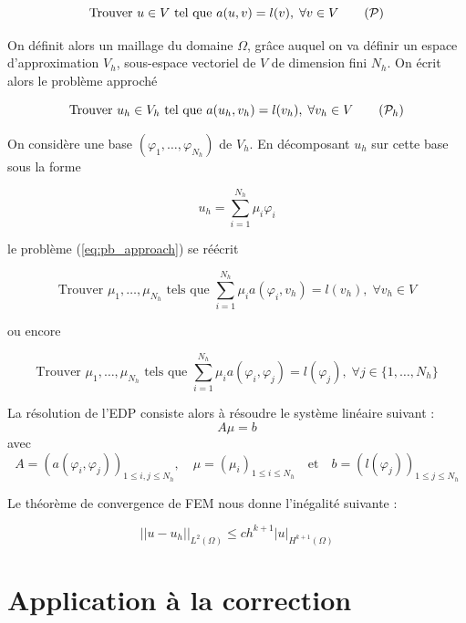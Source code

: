 \documentclass[french]{article}
\begin{document}
	\begin{equation}
		\text{Trouver } u\in V \text{ tel que } a(u,v)=l(v), \;\forall v\in V \tag{$\mathcal{P}$}
	\end{equation}

	On définit alors un maillage du domaine $\Omega$, grâce auquel on va définir un espace d'approximation $V_h$, sous-espace vectoriel de $V$ de dimension fini $N_h$. On écrit alors le problème approché

	\begin{equation}
		\text{Trouver } u_h\in V_h \text{ tel que } a(u_h,v_h)=l(v_h), \;\forall v_h\in V \tag{$\mathcal{P}_h$} \label{eq:pb_approach}
	\end{equation}

	On considère une base $(\varphi_1,\dots,\varphi_{N_h})$ de $V_h$. En décomposant $u_h$ sur cette base sous la forme
	
	\begin{equation}
		\label{decomp1}
		u_h=\sum_{i=1}^{N_h}\mu_i\varphi_i	
	\end{equation}
	
	le problème (\ref{eq:pb_approach}) se réécrit 
	
	\begin{equation*}
		\text{Trouver } \mu_1,\dots,\mu_{N_h} \text{ tels que } \sum_{i=1}^{N_h}\mu_i a(\varphi_i,v_h)=l(v_h), \;\forall v_h\in V 
	\end{equation*}

	ou encore
	
	\begin{equation*}
		\text{Trouver } \mu_1,\dots,\mu_{N_h} \text{ tels que } \sum_{i=1}^{N_h}\mu_i a(\varphi_i,\varphi_j)=l(\varphi_j), \;\forall j\in \{1,\dots,N_h\}
	\end{equation*}
	
	La résolution de l'EDP consiste alors à résoudre le système linéaire suivant :
	$$A\mu=b$$
	avec
	$$A=(a(\varphi_i,\varphi_j))_{1\le i,j\le N_h}, \quad \mu=(\mu_i)_{1\le i\le N_h} \quad \text{et} \quad b=(l(\varphi_j))_{1\le j\le N_h}$$
	
	Le théorème de convergence de FEM nous donne l'inégalité suivante :
	
	\begin{equation}
		||u-u_h||_{L^2(\Omega)}\le ch^{k+1}|u|_{H^{k+1}(\Omega)} \label{ine1}
	\end{equation}
	
	\section*{Application à la correction}
	
\end{document}
